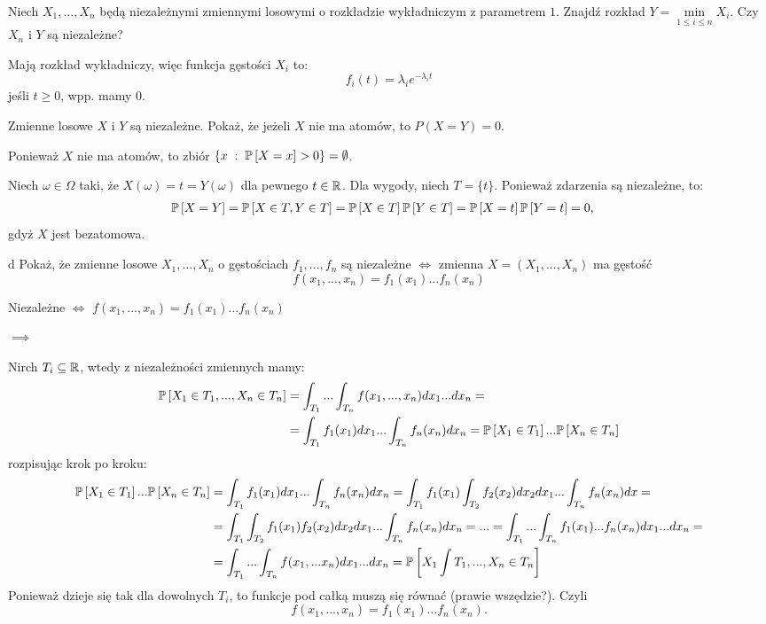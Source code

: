 \documentclass{article}
\begin{document}
\begin{problem}[4]{}
Niech $X_1,...,X_n$ będą niezależnymi zmiennymi losowymi o rozkładzie wykładniczym z parametrem $1$. Znajdź rozkład $Y=\min\limits_{1\leq i\leq n}X_i$. Czy $X_n$ i $Y$ są niezależne?
\end{problem}

Mają rozkład wykładniczy, więc funkcja gęstości $X_i$ to:
$$f_i(t)=\lambda_ie^{-\lambda_i t}$$
jeśli $t\geq 0$, wpp. mamy $0$.


\begin{problem}[5]{}
Zmienne losowe $X$ i $Y$ są niezależne. Pokaż, że jeżeli $X$ nie ma atomów, to $P(X=Y)=0$.
\end{problem}

Ponieważ $X$ nie ma atomów, to zbiór $\{x\;:\;\prob{X=x}>0\}=\emptyset$.

Niech $\omega\in\Omega$ taki, że $X(\omega)=t=Y(\omega)$ dla pewnego $t\in\mathbb{R}$. Dla wygody, niech $T=\{t\}$. Ponieważ zdarzenia są niezależne, to:
\begin{align*}
    \prob{X=Y}&=\prob{X\in T, Y\in T}=\prob{X\in T}\prob{Y\in T}=\prob{X=t}\prob{Y=t}=0,
\end{align*}
gdyż $X$ jest bezatomowa.

\begin{problem}[7]{d}
Pokaż, że zmienne losowe $X_1,...,X_n$ o gęstościach $f_1,...,f_n$ są niezależne $\iff$ zmienna $X=(X_1,...,X_n)$ ma gęstość
$$f(x_1,...,x_n)=f_1(x_1)...f_n(x_n)$$
\end{problem}

\begin{center}
Niezależne $\iff$ $f(x_1,...,x_n)=f_1(x_1)...f_n(x_n)$
\end{center}

$\implies$

Nirch $T_i\subseteq\mathbb{R}$, wtedy z niezależności zmiennych mamy:
\begin{align*}
    \prob{X_1\in T_1,...,X_n\in T_n}&=\int_{T_1}...\int_{T_n}f(x_1,...,x_n)dx_1...dx_n=\\
    &=\int_{T_1}f_1(x_1)dx_1...\int_{T_n}f_n(x_n)dx_n=\prob{X_1\in T_1}...\prob{X_n\in T_n}
\end{align*}
rozpisując krok po kroku:
\begin{align*}
    \prob{X_1\in T_1}...\prob{X_n\in T_n}&=\int_{T_1}f_1(x_1)dx_1...\int_{T_n}f_n(x_n)dx_n=\int_{T_1}f_1(x_1)\int_{T_2}f_2(x_2)dx_2dx_1...\int_{T_n}f_n(x_n)dx=\\
    &=\int_{T_1}\int_{T_2}f_1(x_1)f_2(x_2)dx_2dx_1...\int_{T_n}f_n(x_n)dx_n=...=\int_{T_1}...\int_{T_n}f_1(x_1)...f_n(x_n)dx_1...dx_n=\\
    &=\int_{T_1}...\int_{T_n}f(x_1,...x_n)dx_1...dx_n=\prob{X_1\int T_1,...,X_n\in T_n}
\end{align*}
Ponieważ dzieje się tak dla dowolnych $T_i$, to funkcje pod całką muszą się równać (prawie wszędzie?). Czyli
$$f(x_1,...,x_n)=f_1(x_1)...f_n(x_n).$$
\end{document}
